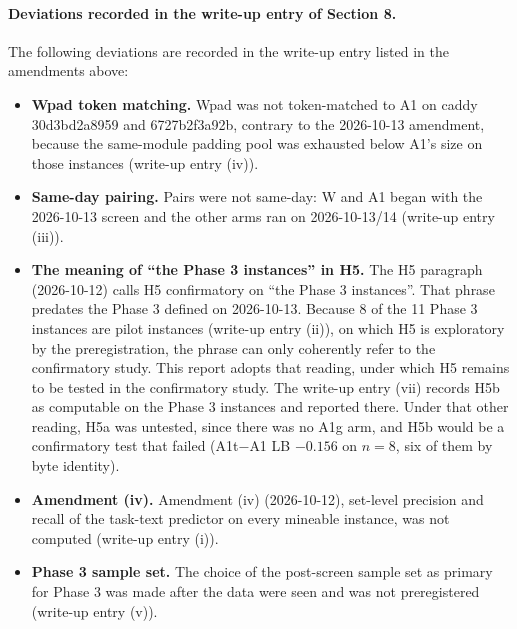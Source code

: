 \documentclass[10pt]{article}
\begin{document}
\paragraph{Deviations recorded in the write-up entry of Section 8.} The following deviations are recorded in the write-up entry listed in the amendments above:
\begin{itemize}
\item \textbf{Wpad token matching.} Wpad was not token-matched to A1 on caddy 30d3bd2a8959 and 6727b2f3a92b, contrary to the 2026-10-13 amendment, because the same-module padding pool was exhausted below A1's size on those instances (write-up entry (iv)).
\item \textbf{Same-day pairing.} Pairs were not same-day: W and A1 began with the 2026-10-13 screen and the other arms ran on 2026-10-13/14 (write-up entry (iii)).
\item \textbf{The meaning of ``the Phase 3 instances'' in H5.} The H5 paragraph (2026-10-12) calls H5 confirmatory on ``the Phase 3 instances''. That phrase predates the Phase 3 defined on 2026-10-13. Because 8 of the 11 Phase 3 instances are pilot instances (write-up entry (ii)), on which H5 is exploratory by the preregistration, the phrase can only coherently refer to the confirmatory study. This report adopts that reading, under which H5 remains to be tested in the confirmatory study. The write-up entry (vii) records H5b as computable on the Phase 3 instances and reported there. Under that other reading, H5a was untested, since there was no A1g arm, and H5b would be a confirmatory test that failed (A1t$-$A1 LB $-0.156$ on $n=8$, six of them by byte identity).
\item \textbf{Amendment (iv).} Amendment (iv) (2026-10-12), set-level precision and recall of the task-text predictor on every mineable instance, was not computed (write-up entry (i)).
\item \textbf{Phase 3 sample set.} The choice of the post-screen sample set as primary for Phase 3 was made after the data were seen and was not preregistered (write-up entry (v)).
\end{itemize}
\end{document}
